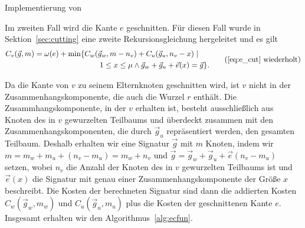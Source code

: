 \begin{algorithm}
    \caption{Implementierung von }\label{alg:encfun}
    \begin{algorithmic}[1]
            \label{alg:encfun:line:assign}
        \EndFunction
    \end{algorithmic}
\end{algorithm}

Im zweiten Fall wird die Kante $e$ geschnitten.
Für diesen Fall wurde in Sektion~\ref{sec:cutting} eine zweite Rekursionsgleichung hergeleitet und es gilt
\begin{equation*}
    \begin{aligned}
        C_v(\vec{g}, m) = \weight(e) + \min \{ & C_w(\vec{g}_w, m - n_v) + C_u(\vec{g}_u, n_v - x) \mid \\ & \qquad 1 \leq x \leq \mu \land \vec{g}_w + \vec{g}_u + \vec{e}(x) = \vec{g} \}. 
    \end{aligned}
    \tag{\ref{eq:e_cut} wiederholt}
\end{equation*}

Da die Kante von $v$ zu seinem Elternknoten geschnitten wird, ist $v$ nicht in der Zusammenhangskomponente, die auch die Wurzel $r$ enthält.
Die Zusammhangskomponente, in der $v$ erhalten ist, besteht ausschließlich aus Knoten des in $v$ gewurzelten Teilbaums und überdeckt zusammen mit den Zusammenhangskomponenten, die durch $\vec{g}_u$ repräsentiert werden, den gesamten Teilbaum.
Deshalb erhalten wir eine Signatur $\vec{g}$ mit $m$ Knoten, indem wir $m = m_w + m_u + (n_v - m_u) = m_w + n_v$ und $\vec{g} = \vec{g}_w + \vec{g}_u + \vec{e}(n_v - m_u)$ setzen, wobei $n_v$ die Anzahl der Knoten des in $v$ gewurzelten Teilbaums ist und $\vec{e}(x)$ die Signatur mit genau einer Zusammenhangskomponente der Größe $x$ beschreibt.
Die Kosten der berechneten Signatur sind dann die addierten Kosten $C_w(\vec{g}_w, m_w)$ und $C_u(\vec{g}_u, m_u)$ plus die Kosten der geschnittenen Kante $e$. 
Insgesamt erhalten wir den Algorithmus~\ref{alg:ecfun}.

